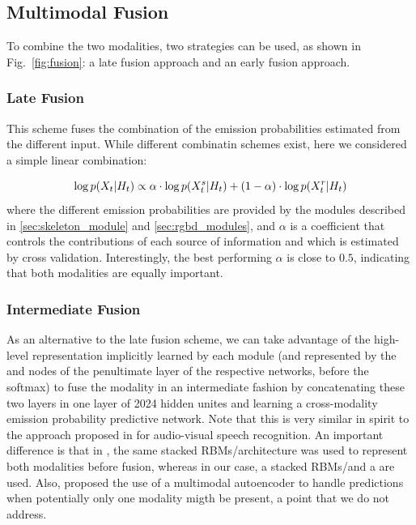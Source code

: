 \subsection{Multimodal Fusion}
To combine the two modalities, two strategies can be used, as shown in Fig.~\ref{fig:fusion}:
a late fusion approach and an early fusion approach.


\subsubsection{Late Fusion}
%
This scheme fuses the combination of the emission probabilities estimated from the different input.
While different combinatin schemes exist, here we considered a simple linear combination:

\begin{equation}
\log p(X_t | H_t)  \propto  \alpha \cdot \log p(X_t^s | H_t) + (1-\alpha)\cdot \log p(X_t^r | H_t)
\end{equation}
where the different emission probabilities are provided by the modules described in \ref{sec:skeleton_module} and \ref{sec:rgbd_modules},
and $\alpha$ is a coefficient that controls the contributions of each source of information and which is estimated by cross validation.
Interestingly, the best performing $\alpha$ is close to $0.5$, indicating that both modalities are equally important.


\subsubsection{Intermediate Fusion}
\label{early_fusion}

As an alternative to the late fusion scheme, we can take advantage of the high-level representation implicitly learned by each module
(and represented by the \highSK and \highRGBD nodes of the penultimate layer of the respective networks, before the softmax)
to fuse the modality in an intermediate fashion by concatenating these two layers in one layer of 2024 hidden unites
and learning a cross-modality emission probability predictive network.
%
Note that this is very similar in spirit to the approach proposed in \cite{Ngiam2011multimodal}
for audio-visual speech recognition.
%
An important difference is that in \cite{Ngiam2011multimodal}, the same stacked RBMs/\DBN architecture was used
to represent both modalities before fusion, whereas in our case, a stacked RBMs/\DBN and a \ThreeDCNN are used.
%
Also, \cite{Ngiam2011multimodal} proposed the use of a multimodal autoencoder to handle predictions when potentially
only one modality migth be present, a point that we do not address.

